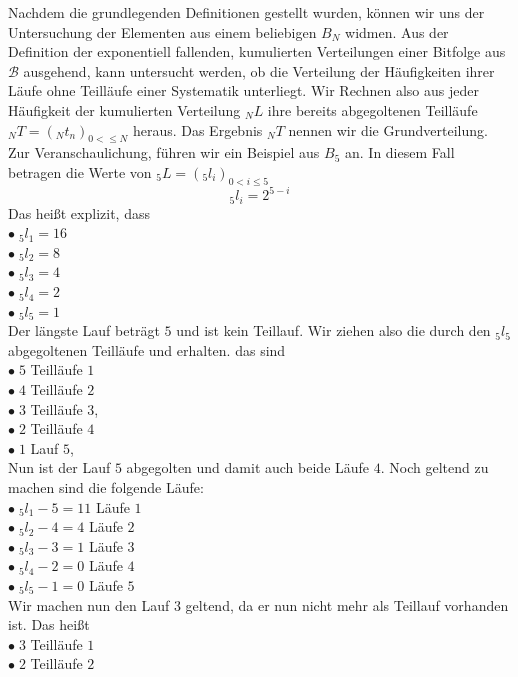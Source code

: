 \documentclass[11pt,oneside,a4paper]{scrreprt}
\begin{document}
\noindent Nachdem die grundlegenden Definitionen gestellt wurden, können wir uns der Untersuchung der Elementen aus einem beliebigen $B_N$ widmen. Aus der Definition der exponentiell fallenden, kumulierten Verteilungen einer Bitfolge aus $\mathcal B$ ausgehend, kann untersucht werden, ob die Verteilung der Häufigkeiten ihrer Läufe ohne Teilläufe einer Systematik unterliegt. Wir Rechnen also aus jeder Häufigkeit der kumulierten Verteilung $_NL$ ihre bereits abgegoltenen Teilläufe $_NT=(_Nt_n)_{0<\leq N}$ heraus. Das Ergebnis $_NT$ nennen wir die Grundverteilung. Zur Veranschaulichung, führen wir ein Beispiel aus $B_5$ an. In diesem Fall betragen die Werte von $_5L=(_5l_i)_{0<i\leq5}$
\begin{equation}
_5l_i=2^{5-i}
\end{equation}
\noindent Das heißt explizit, dass\\
\indent $\bullet\; _5l_1=16$\\
\indent $\bullet\; _5l_2=8$\\
\indent $\bullet\; _5l_3=4$\\
\indent $\bullet\; _5l_4=2$\\
\indent $\bullet\; _5l_5=1$\\
Der längste Lauf beträgt $5$ und ist kein Teillauf. Wir ziehen also die durch den $_5l_5$ abgegoltenen Teilläufe und erhalten. das sind\\
\indent $\bullet\; 5$ Teilläufe $1$\\
\indent $\bullet\; 4$ Teilläufe $2$\\
\indent $\bullet\; 3$ Teilläufe $3$,\\
\indent $\bullet\; 2$ Teilläufe $4$\\
\indent $\bullet\; 1$ Lauf $5$,\\
Nun ist der Lauf $5$ abgegolten und damit auch beide Läufe $4$. Noch geltend zu machen sind die folgende Läufe:\\
\indent $\bullet\; _5l_1-5=11$ Läufe $1$\\
\indent $\bullet\; _5l_2-4=4$ Läufe $2$\\
\indent $\bullet\; _5l_3-3=1$ Läufe $3$\\
\indent $\bullet\; _5l_4-2=0$ Läufe $4$\\
\indent $\bullet\; _5l_5-1=0$ Läufe $5$\\
Wir machen nun den Lauf $3$ geltend, da er nun nicht mehr als Teillauf vorhanden ist. Das heißt\\
\indent $\bullet\; 3$ Teilläufe $1$\\
\indent $\bullet\; 2$ Teilläufe $2$\\
\end{document}
